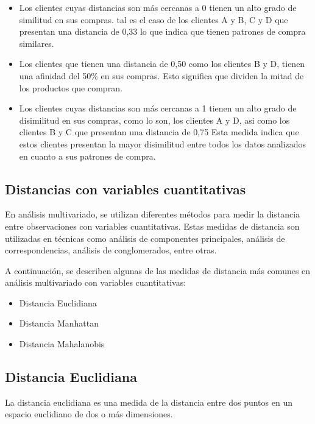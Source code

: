 \documentclass[
]{article}
\begin{document}
\begin{itemize}
\item
  Los clientes cuyas distancias son más cercanas a 0 tienen un alto
  grado de similitud en sus compras. tal es el caso de los clientes A y
  B, C y D que presentan una distancia de 0,33 lo que indica que tienen
  patrones de compra similares.
\item
  Los clientes que tienen una distancia de 0,50 como los clientes B y D,
  tienen una afinidad del 50\% en sus compras. Esto significa que
  dividen la mitad de los productos que compran.
\item
  Los clientes cuyas distancias son más cercanas a 1 tienen un alto
  grado de disimilitud en sus compras, como lo son, los clientes A y D,
  asi como los clientes B y C que presentan una distancia de 0,75 Esta
  medida indica que estos clientes presentan la mayor disimilitud entre
  todos los datos analizados en cuanto a sus patrones de compra.
\end{itemize}

\hypertarget{distancias-con-variables-cuantitativas}{%
\subsection{Distancias con variables
cuantitativas}\label{distancias-con-variables-cuantitativas}}

En análisis multivariado, se utilizan diferentes métodos para medir la
distancia entre observaciones con variables cuantitativas. Estas medidas
de distancia son utilizadas en técnicas como análisis de componentes
principales, análisis de correspondencias, análisis de conglomerados,
entre otras.

A continuación, se describen algunas de las medidas de distancia más
comunes en análisis multivariado con variables cuantitativas:

\begin{itemize}
\item
  Distancia Euclidiana
\item
  Distancia Manhattan
\item
  Distancia Mahalanobis
\end{itemize}

\hypertarget{distancia-euclidiana}{%
\subsection{Distancia Euclidiana}\label{distancia-euclidiana}}

La distancia euclidiana es una medida de la distancia entre dos puntos
en un espacio euclidiano de dos o más dimensiones.
\end{document}
